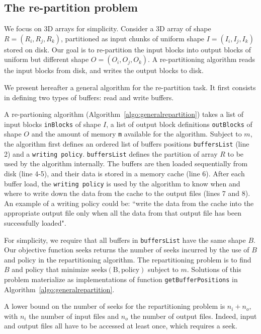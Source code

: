 \documentclass[conference]{IEEEtran}
\begin{document}
\subsection{The re-partition problem}
We focus on 3D arrays for simplicity. Consider a 3D array of shape $R =
(R_i, R_j, R_k)$, partitioned as input chunks of uniform shape $I = (I_i,
I_j, I_k)$ stored on disk. Our goal is to re-partition the input blocks into
output blocks of uniform but different shape $O = (O_i, O_j, O_k)$.
A re-partitioning algorithm reads the input blocks from disk, and writes the
output blocks to disk.

We present hereafter a general algorithm for the re-partition task.
It first consists in defining two types of buffers: read and write buffers.

A re-partioning algorithm (Algorithm~\ref{algo:generalrepartition}) takes a
list of input blocks \texttt{inBlocks} of shape $I$, a list of output block
definitions \texttt{outBlocks} of shape $O$ and the amount of memory \texttt{m}
available for the algorithm.
Subject to $m$, the algorithm first defines an ordered list of buffers positions
\texttt{buffersList} (line 2) and a \texttt{writing policy}.
\texttt{buffersList} defines the partition of array $R$ to be used by the algorithm internally.
The buffers are then loaded sequentially from disk
(line 4-5), and their data is stored in a memory cache (line 6). After each buffer load,
the \texttt{writing policy} is used by the algorithm to know when and where to
write down the data from the cache to the output files (lines 7 and 8). An
example of a writing policy could be:
``write the data from the cache into the appropriate output file only when all
the data from that output file has been successfully loaded".

For simplicity, we require that all buffers in \texttt{buffersList} have
the same shape $B$. Our objective function
$\mathrm{seeks}$ returns the number of seeks incurred by the use of
$B$ and $\mathrm{policy}$ in the repartitioning algorithm. The
repartitioning problem is to find $B$ and $\mathrm{policy}$ that minimize
$\mathrm{seeks(B, policy)}$ subject to $m$. Solutions of this problem materialize as
implementations of function \texttt{getBufferPositions} in
Algorithm~\ref{algo:generalrepartition}.

A lower bound on the number of seeks for the repartitioning problem is
$n_i + n_o$, with $n_i$ the number of input files and $n_o$ the number of output
files. Indeed, input and output files all have to be accessed at least once,
which requires a seek.
\end{document}
